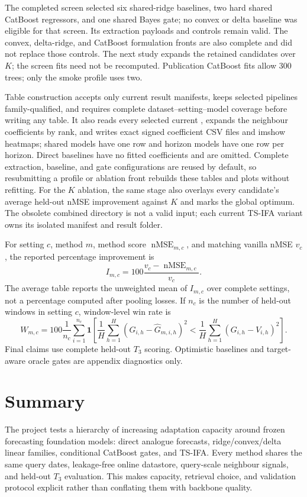\documentclass[10pt]{article}
\newcommand{\code}[1]{\texttt{\detokenize{#1}}}
\newcommand{\Tthree}{T_3}
\newcommand{\nMSE}{\operatorname{nMSE}}
\begin{document}
The completed screen selected six shared-ridge baselines, two hard shared
CatBoost regressors, and one shared Bayes gate; no convex or delta baseline was
eligible for that screen. Its extraction payloads and controls remain valid.
The convex, delta-ridge, and CatBoost formulation fronts are also complete and
did not replace those controls. The next study expands the retained candidates
over $K$; the screen fits need not be recomputed. Publication CatBoost fits
allow 300 trees; only the smoke profile uses two.

Table construction accepts only current result manifests, keeps selected
pipelines family-qualified, and requires complete dataset--setting--model
coverage before writing any table. It also reads every selected current
\code{baseline_artifacts.pt}, expands the neighbour coefficients by rank, and
writes exact signed coefficient CSV files and imshow heatmaps; shared models
have one row and horizon models have one row per horizon. Direct baselines have
no fitted coefficients and are omitted. Complete extraction, baseline, and gate
configurations are reused by default, so resubmitting a profile or ablation
front rebuilds these tables and plots without refitting. For the $K$ ablation,
the same stage also overlays every candidate's average held-out nMSE improvement
against $K$ and marks the global optimum. The obsolete combined
\code{TS-IFA} directory is not a valid input; each current TS-IFA variant owns
its isolated manifest and result folder.

For setting $c$, method $m$, method score $\nMSE_{m,c}$, and matching vanilla
nMSE $v_c$, the reported percentage improvement is
\[
 I_{m,c}=100\frac{v_c-\nMSE_{m,c}}{v_c}.
\]
The average table reports the unweighted mean of $I_{m,c}$ over complete
settings, not a percentage computed after pooling losses. If $n_c$ is the
number of held-out windows in setting $c$, window-level win rate is
\[
 W_{m,c}=100\frac1{n_c}\sum_{i=1}^{n_c}
 \mathbf1\!\left[
 \frac1H\sum_{h=1}^H(G_{i,h}-\widehat G_{m,i,h})^2
 <\frac1H\sum_{h=1}^H(G_{i,h}-V_{i,h})^2
 \right].
\]
Final claims use complete held-out $\Tthree$ scoring. Optimistic
\code{*_eval_fit} baselines and target-aware oracle gates are appendix
diagnostics only.

\section{Summary}

The project tests a hierarchy of increasing adaptation capacity around frozen
forecasting foundation models: direct analogue forecasts, ridge/convex/delta
linear families, conditional CatBoost gates, and TS-IFA. Every method
shares the same query dates, leakage-free online datastore, query-scale
neighbour signals, and held-out $\Tthree$ evaluation. This makes capacity,
retrieval choice, and validation protocol explicit rather than conflating them
with backbone quality.



\end{document}
